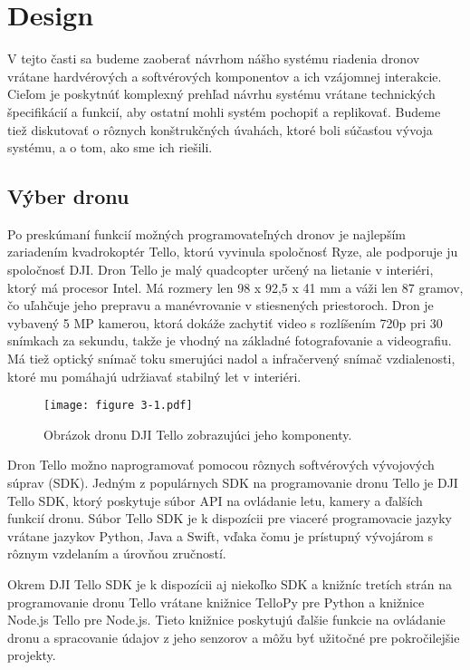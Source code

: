 \section{Design}
V tejto časti sa budeme zaoberať návrhom nášho systému riadenia dronov vrátane hardvérových a softvérových komponentov a ich vzájomnej interakcie. Cieľom je poskytnúť komplexný prehľad návrhu systému vrátane technických špecifikácií a funkcií, aby ostatní mohli systém pochopiť a replikovať. Budeme tiež diskutovať o rôznych konštrukčných úvahách, ktoré boli súčasťou vývoja systému, a o tom, ako sme ich riešili.

\subsection{Výber dronu}
Po preskúmaní funkcií možných programovateľných dronov je najlepším zariadením kvadrokoptér Tello, ktorú vyvinula spoločnosť Ryze, ale podporuje ju spoločnosť DJI. Dron Tello je malý quadcopter určený na lietanie v interiéri, ktorý má procesor Intel. Má rozmery len 98 x 92,5 x 41 mm a váži len 87 gramov, čo uľahčuje jeho prepravu a manévrovanie v stiesnených priestoroch. Dron je vybavený 5 MP kamerou, ktorá dokáže zachytiť video s rozlíšením 720p pri 30 snímkach za sekundu, takže je vhodný na základné fotografovanie a videografiu. Má tiež optický snímač toku smerujúci nadol a infračervený snímač vzdialenosti, ktoré mu pomáhajú udržiavať stabilný let v interiéri.

\begin{figure}[ht!]
    \centering
    \texttt{[image: figure 3-1.pdf]}
    \caption{Obrázok dronu DJI Tello zobrazujúci jeho komponenty.}
    \label{o:3-1}
\end{figure} 

Dron Tello možno naprogramovať pomocou rôznych softvérových vývojových súprav (SDK). Jedným z populárnych SDK na programovanie dronu Tello je DJI Tello SDK, ktorý poskytuje súbor API na ovládanie letu, kamery a ďalších funkcií dronu. Súbor Tello SDK je k dispozícii pre viaceré programovacie jazyky vrátane jazykov Python, Java a Swift, vďaka čomu je prístupný vývojárom s rôznym vzdelaním a úrovňou zručností.

Okrem DJI Tello SDK je k dispozícii aj niekoľko SDK a knižníc tretích strán na programovanie dronu Tello vrátane knižnice TelloPy pre Python a knižnice Node.js Tello pre Node.js. Tieto knižnice poskytujú ďalšie funkcie na ovládanie dronu a spracovanie údajov z jeho senzorov a môžu byť užitočné pre pokročilejšie projekty.

